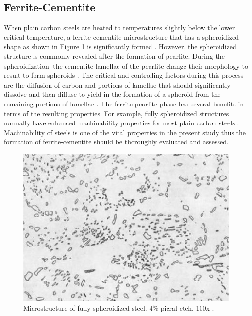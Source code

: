 \documentclass[12pt]{report}
\begin{document}
\subsection{Ferrite-Cementite}
When plain carbon steels are heated to temperatures slightly below the lower critical temperature, a ferrite-cementite microstructure that has a spheroidized shape as shown in Figure \ref{ch3:figure:spheroidized_steel} is significantly formed \cite{molabe2018determining}. However, the spheroidized structure is commonly revealed after the formation of pearlite. During the spheroidization, the cementite lamellae of the pearlite change their morphology to result to form spheroids \cite{molabe2018determining}.
The critical and controlling factors during this process are the diffusion of carbon and portions of lamellae that should significantly dissolve and then diffuse to yield in the formation of a spheroid from the remaining portions of lamellae \cite{molabe2018determining}. The ferrite-pearlite phase has several benefits in terms of the resulting properties. For example, fully spheroidized structures normally have enhanced machinability properties for most plain carbon steels \cite{molabe2018determining}.  Machinability of steels is one of the vital properties in the present study thus the formation of ferrite-cementite should be thoroughly evaluated and assessed.

\begin{figure}[H]
    \centering
    \includegraphics[width=.55\textwidth]{microstructure_of_fully_spheroidizel_steel.jpg}
    \caption{Microstructure of fully spheroidized steel. 4\% picral etch. 100x \cite{molabe2018determining}.}
    \label{ch3:figure:spheroidized_steel}
\end{figure}
\end{document}
